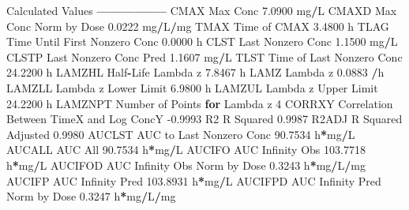 \documentclass[12pt,]{krantz}
\newenvironment{Shaded}{\begin{snugshade}}{\end{snugshade}}
\newcommand{\ControlFlowTok}[1]{\textcolor[rgb]{0.13,0.29,0.53}{\textbf{#1}}}
\newcommand{\DecValTok}[1]{\textcolor[rgb]{0.00,0.00,0.81}{#1}}
\newcommand{\FloatTok}[1]{\textcolor[rgb]{0.00,0.00,0.81}{#1}}
\newcommand{\NormalTok}[1]{#1}
\newcommand{\OperatorTok}[1]{\textcolor[rgb]{0.81,0.36,0.00}{\textbf{#1}}}
\begin{document}
\begin{Shaded}
\begin{Highlighting}[]
{{{{\NormalTok{Calculated Values}
\OperatorTok{-----------------}
\NormalTok{CMAX       Max Conc                                        }\FloatTok{7.0900}\NormalTok{ mg}\OperatorTok{/}\NormalTok{L}
\NormalTok{CMAXD      Max Conc Norm by Dose                           }\FloatTok{0.0222}\NormalTok{ mg}\OperatorTok{/}\NormalTok{L}\OperatorTok{/}\NormalTok{mg}
\NormalTok{TMAX       Time of CMAX                                    }\FloatTok{3.4800}\NormalTok{ h}
\NormalTok{TLAG       Time Until First Nonzero Conc                   }\FloatTok{0.0000}\NormalTok{ h}
\NormalTok{CLST       Last Nonzero Conc                               }\FloatTok{1.1500}\NormalTok{ mg}\OperatorTok{/}\NormalTok{L}
\NormalTok{CLSTP      Last Nonzero Conc Pred                          }\FloatTok{1.1607}\NormalTok{ mg}\OperatorTok{/}\NormalTok{L}
\NormalTok{TLST       Time of Last Nonzero Conc                      }\FloatTok{24.2200}\NormalTok{ h}
\NormalTok{LAMZHL     Half}\OperatorTok{-}\NormalTok{Life Lambda z                              }\FloatTok{7.8467}\NormalTok{ h}
\NormalTok{LAMZ       Lambda z                                        }\FloatTok{0.0883} \OperatorTok{/}\NormalTok{h}
\NormalTok{LAMZLL     Lambda z Lower Limit                            }\FloatTok{6.9800}\NormalTok{ h}
\NormalTok{LAMZUL     Lambda z Upper Limit                           }\FloatTok{24.2200}\NormalTok{ h}
\NormalTok{LAMZNPT    Number of Points }\ControlFlowTok{for}\NormalTok{ Lambda z                   }\DecValTok{4}
\NormalTok{CORRXY     Correlation Between TimeX and Log ConcY        }\FloatTok{-0.9993} 
\NormalTok{R2         R Squared                                       }\FloatTok{0.9987} 
\NormalTok{R2ADJ      R Squared Adjusted                              }\FloatTok{0.9980} 
\NormalTok{AUCLST     AUC to Last Nonzero Conc                       }\FloatTok{90.7534}\NormalTok{ h}\OperatorTok{*}\NormalTok{mg}\OperatorTok{/}\NormalTok{L}
\NormalTok{AUCALL     AUC All                                        }\FloatTok{90.7534}\NormalTok{ h}\OperatorTok{*}\NormalTok{mg}\OperatorTok{/}\NormalTok{L}
\NormalTok{AUCIFO     AUC Infinity Obs                              }\FloatTok{103.7718}\NormalTok{ h}\OperatorTok{*}\NormalTok{mg}\OperatorTok{/}\NormalTok{L}
\NormalTok{AUCIFOD    AUC Infinity Obs Norm by Dose                   }\FloatTok{0.3243}\NormalTok{ h}\OperatorTok{*}\NormalTok{mg}\OperatorTok{/}\NormalTok{L}\OperatorTok{/}\NormalTok{mg}
\NormalTok{AUCIFP     AUC Infinity Pred                             }\FloatTok{103.8931}\NormalTok{ h}\OperatorTok{*}\NormalTok{mg}\OperatorTok{/}\NormalTok{L}
\NormalTok{AUCIFPD    AUC Infinity Pred Norm by Dose                  }\FloatTok{0.3247}\NormalTok{ h}\OperatorTok{*}\NormalTok{mg}\OperatorTok{/}\NormalTok{L}\OperatorTok{/}\NormalTok{mg}
}}}}
\end{Highlighting}
\end{Shaded}
\end{document}
